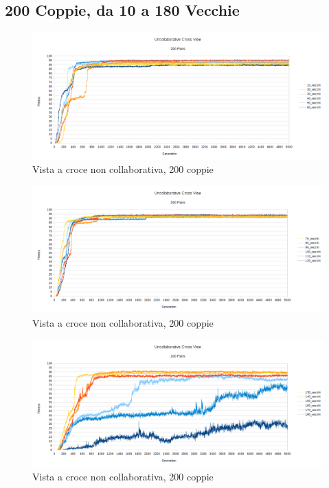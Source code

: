 \subsection{200 Coppie, da 10 a 180 Vecchie}
\begin{figure}[ht]
	\centering
	\includegraphics[scale=0.7,angle=90]{imgs/cross_nc_200_pairs_10_60_old.png}
	\caption{Vista a croce non collaborativa, 200 coppie}
	\label{figure:cross_nc_200_10_60}
\end{figure}
\begin{figure}[ht]
	\centering
	\includegraphics[scale=0.7,angle=90]{imgs/cross_nc_200_pairs_70_120_old.png}
	\caption{Vista a croce non collaborativa, 200 coppie}
	\label{figure:cross_nc_200_70_120}
\end{figure}
\begin{figure}[ht]
	\centering
	\includegraphics[scale=0.7,angle=90]{imgs/cross_nc_200_pairs_130_180_old.png}
	\caption{Vista a croce non collaborativa, 200 coppie}
	\label{figure:cross_nc_200_130_180}
\end{figure}
